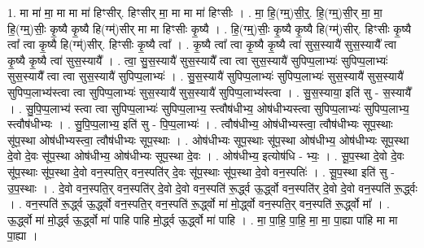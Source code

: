 \documentclass[17pt]{extarticle}
\begin{document}
1. मा मा॑ मा॒ मा मा मा॑ हिꣳसीर्. हिꣳसीर् मा॒ मा मा मा॑ हिꣳसीः । . मा॒ हि॒(ग्म्॒)सी॒र्॒. हि॒(ग्म्॒)सी॒र् मा॒ मा॒ हि॒(ग्म्॒)सीः॒ कृ॒ष्यै कृ॒ष्यै हि(ग्म्॑)सीर् मा मा हिꣳसीः कृ॒ष्यै । . हि॒(ग्म्॒)सीः॒ कृ॒ष्यै कृ॒ष्यै हि(ग्म्॑)सीर्. हिꣳसीः कृ॒ष्यै त्वा᳚ त्वा कृ॒ष्यै हि(ग्म्॑)सीर्. हिꣳसीः कृ॒ष्यै त्वा᳚ । . कृ॒ष्यै त्वा᳚ त्वा कृ॒ष्यै कृ॒ष्यै त्वा॑ सुस॒स्यायै॑ सुस॒स्यायै᳚ त्वा कृ॒ष्यै कृ॒ष्यै त्वा॑ सुस॒स्यायै᳚ । . त्वा॒ सु॒स॒स्यायै॑ सुस॒स्यायै᳚ त्वा त्वा सुस॒स्यायै॑ सुपिप्प॒लाभ्यः॑ सुपिप्प॒लाभ्यः॑ सुस॒स्यायै᳚ त्वा त्वा सुस॒स्यायै॑ सुपिप्प॒लाभ्यः॑ । . सु॒स॒स्यायै॑ सुपिप्प॒लाभ्यः॑ सुपिप्प॒लाभ्यः॑ सुस॒स्यायै॑ सुस॒स्यायै॑ सुपिप्प॒लाभ्य॑स्त्वा त्वा सुपिप्प॒लाभ्यः॑ सुस॒स्यायै॑ सुस॒स्यायै॑ सुपिप्प॒लाभ्य॑स्त्वा । . सु॒स॒स्याया॒ इति॑ सु - स॒स्यायै᳚ । . सु॒पि॒प्प॒लाभ्य॑ स्त्वा त्वा सुपिप्प॒लाभ्यः॑ सुपिप्प॒लाभ्य॒ स्त्वौष॑धीभ्य॒ ओष॑धीभ्यस्त्वा सुपिप्प॒लाभ्यः॑ सुपिप्प॒लाभ्य॒ स्त्वौष॑धीभ्यः । . सु॒पि॒प्प॒लाभ्य॒ इति॑ सु - पि॒प्प॒लाभ्यः॑ । . त्वौष॑धीभ्य॒ ओष॑धीभ्यस्त्वा॒ त्वौष॑धीभ्यः सूप॒स्थाः सू॑प॒स्था ओष॑धीभ्यस्त्वा॒ त्वौष॑धीभ्यः सूप॒स्थाः । . ओष॑धीभ्यः सूप॒स्थाः सू॑प॒स्था ओष॑धीभ्य॒ ओष॑धीभ्यः सूप॒स्था दे॒वो दे॒वः सू॑प॒स्था ओष॑धीभ्य॒ ओष॑धीभ्यः सूप॒स्था दे॒वः । . ओष॑धीभ्य॒ इत्योष॑धि - भ्यः॒ । . सू॒प॒स्था दे॒वो दे॒वः सू॑प॒स्थाः सू॑प॒स्था दे॒वो वन॒स्पति॒र् वन॒स्पति॑र् दे॒वः सू॑प॒स्थाः सू॑प॒स्था दे॒वो वन॒स्पतिः॑ । . सू॒प॒स्था इति॑ सु - उ॒प॒स्थाः । . दे॒वो वन॒स्पति॒र् वन॒स्पति॑र् दे॒वो दे॒वो वन॒स्पति॑ रू॒र्द्ध्व ऊ॒र्द्ध्वो वन॒स्पति॑र् दे॒वो दे॒वो वन॒स्पति॑ रू॒र्द्ध्वः । . वन॒स्पति॑ रू॒र्द्ध्व ऊ॒र्द्ध्वो वन॒स्पति॒र् वन॒स्पति॑ रू॒र्द्ध्वो मा॑ मो॒र्द्ध्वो वन॒स्पति॒र् वन॒स्पति॑ रू॒र्द्ध्वो मा᳚ । . ऊ॒र्द्ध्वो मा॑ मो॒र्द्ध्व ऊ॒र्द्ध्वो मा॑ पाहि पाहि मो॒र्द्ध्व ऊ॒र्द्ध्वो मा॑ पाहि । . मा॒ पा॒हि॒ पा॒हि॒ मा॒ मा॒ पा॒ह्या पा॑हि मा मा पा॒ह्या । \newline
\end{document}

